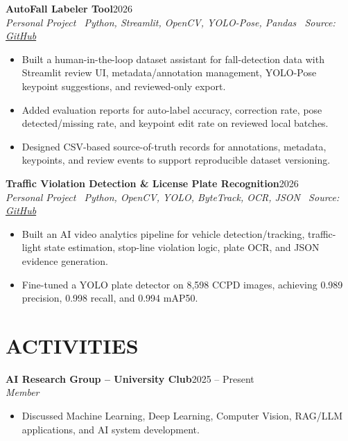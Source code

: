 \documentclass[10pt,a4paper]{article}
\newenvironment{cvitems}{%
    \begin{itemize}[leftmargin=1.15em,itemsep=0pt,topsep=1pt,parsep=0pt]
}{%
    \end{itemize}
}
\newcommand{\entryhead}[2]{%
    \noindent\textbf{#1}\hfill #2\\[-2pt]
}
\newcommand{\entrysub}[1]{%
    \noindent\textit{#1}\\[-1pt]
}
\begin{document}
\entryhead{AutoFall Labeler Tool}{2026}
\entrysub{Personal Project \textbar\ Python, Streamlit, OpenCV, YOLO-Pose, Pandas \textbar\ Source: \href{https://github.com/NguyenKhacBao564/autofall-labeler-tool}{GitHub}}
\begin{cvitems}
    \item Built a human-in-the-loop dataset assistant for fall-detection data with Streamlit review UI, metadata/annotation management, YOLO-Pose keypoint suggestions, and reviewed-only export.
    \item Added evaluation reports for auto-label accuracy, correction rate, pose detected/missing rate, and keypoint edit rate on reviewed local batches.
    \item Designed CSV-based source-of-truth records for annotations, metadata, keypoints, and review events to support reproducible dataset versioning.
\end{cvitems}

\entryhead{Traffic Violation Detection \& License Plate Recognition}{2026}
\entrysub{Personal Project \textbar\ Python, OpenCV, YOLO, ByteTrack, OCR, JSON \textbar\ Source: \href{https://github.com/NguyenKhacBao564/Traffic-Violation-Detection-and-License-Plate-Recognition}{GitHub}}
\begin{cvitems}
    \item Built an AI video analytics pipeline for vehicle detection/tracking, traffic-light state estimation, stop-line violation logic, plate OCR, and JSON evidence generation.
    \item Fine-tuned a YOLO plate detector on 8,598 CCPD images, achieving 0.989 precision, 0.998 recall, and 0.994 mAP50.
\end{cvitems}

\section{ACTIVITIES}
\entryhead{AI Research Group -- University Club}{2025 -- Present}
\entrysub{Member}
\begin{cvitems}
    \item Discussed Machine Learning, Deep Learning, Computer Vision, RAG/LLM applications, and AI system development.
\end{cvitems}
\end{document}
